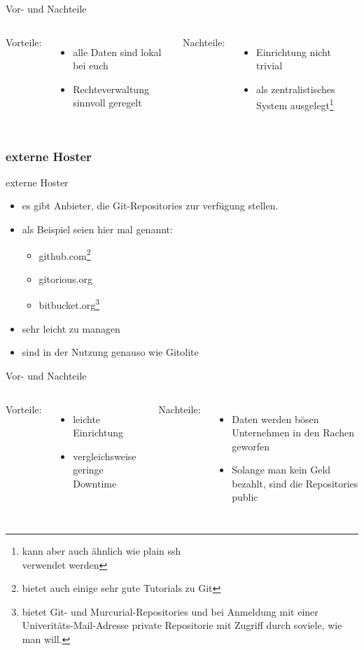 \documentclass{beamer}
\begin{document}
\begin{frame}{Vor- und Nachteile}
	\begin{columns}[c]
		Vorteile:
		\begin{itemize}
			\item alle Daten sind lokal bei euch
			\item Rechteverwaltung sinnvoll geregelt
		\end{itemize}
		Nachteile:
		\begin{itemize}
			\item Einrichtung nicht trivial
			\item als zentralistisches System ausgelegt\footnote{kann aber auch ähnlich wie plain ssh\\ verwendet werden}
		\end{itemize}
	\end{columns}
\end{frame}

\subsubsection{externe Hoster}
\begin{frame}{externe Hoster}
	\begin{itemize}
		\item es gibt Anbieter, die Git-Repositories zur verfügung stellen.
		\item als Beispiel seien hier mal genannt:
			\begin{itemize}
				\item github.com\footnote{bietet auch einige sehr gute Tutorials zu Git}
				\item gitorious.org
				\item bitbucket.org\footnote{bietet Git- und Murcurial-Repositories und bei Anmeldung mit einer Univeritäts-Mail-Adresse private Repositorie mit Zugriff durch soviele, wie man will.}
			\end{itemize}
		\item sehr leicht zu managen
		\item sind in der Nutzung genauso wie Gitolite
	\end{itemize}
\end{frame}

\begin{frame}{Vor- und Nachteile}
	\begin{columns}[c]
		Vorteile:
		\begin{itemize}
			\item leichte Einrichtung
			\item vergleichsweise geringe Downtime
		\end{itemize}
		Nachteile:
		\begin{itemize}
			\item Daten werden bösen Unternehmen in den Rachen geworfen
			\item Solange man kein Geld bezahlt, sind die Repositories public
		\end{itemize}
	\end{columns}
\end{frame}
\end{document}
